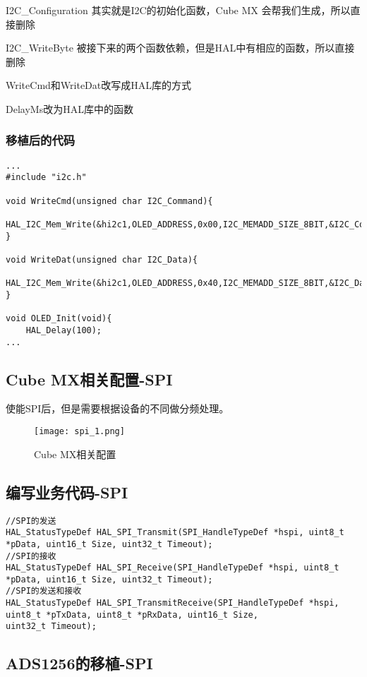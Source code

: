 \documentclass[cn,11pt]{elegantbook}
\begin{document}
I2C\_Configuration 其实就是I2C的初始化函数，Cube MX 会帮我们生成，所以直接删除

I2C\_WriteByte 被接下来的两个函数依赖，但是HAL中有相应的函数，所以直接删除

WriteCmd和WriteDat改写成HAL库的方式

DelayMs改为HAL库中的函数

\subsubsection{移植后的代码}
\begin{lstlisting}
...
#include "i2c.h"

void WriteCmd(unsigned char I2C_Command){
	HAL_I2C_Mem_Write(&hi2c1,OLED_ADDRESS,0x00,I2C_MEMADD_SIZE_8BIT,&I2C_Command,1,100);
}

void WriteDat(unsigned char I2C_Data){
	HAL_I2C_Mem_Write(&hi2c1,OLED_ADDRESS,0x40,I2C_MEMADD_SIZE_8BIT,&I2C_Data,1,100);
}

void OLED_Init(void){
	HAL_Delay(100);
...
\end{lstlisting}

\subsection{Cube MX相关配置-SPI}

使能SPI后，但是需要根据设备的不同做分频处理。

\begin{figure}[htbp]
	\centering
	\texttt{[image: spi\_1.png]}
	\caption{Cube MX相关配置 \label{fig:scatter}}
\end{figure}

\newpage
\subsection{编写业务代码-SPI}

\lstset{language=C}
\begin{lstlisting}
//SPI的发送
HAL_StatusTypeDef HAL_SPI_Transmit(SPI_HandleTypeDef *hspi, uint8_t *pData, uint16_t Size, uint32_t Timeout);
//SPI的接收
HAL_StatusTypeDef HAL_SPI_Receive(SPI_HandleTypeDef *hspi, uint8_t *pData, uint16_t Size, uint32_t Timeout);
//SPI的发送和接收
HAL_StatusTypeDef HAL_SPI_TransmitReceive(SPI_HandleTypeDef *hspi, uint8_t *pTxData, uint8_t *pRxData, uint16_t Size,
uint32_t Timeout);
\end{lstlisting}

\subsection{ADS1256的移植-SPI}
\end{document}
